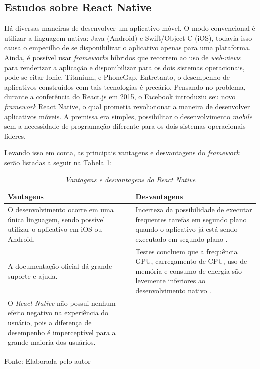 \subsection{Estudos sobre React Native} 
Há diversas maneiras de desenvolver um aplicativo móvel. O modo convencional é utilizar a linguagem nativa: Java (Android) e Swift/Object-C (iOS), todavia isso causa o empecilho de se disponibilizar o aplicativo apenas para uma plataforma. Ainda, é possível usar \textit{frameworks} híbridos que recorrem ao uso de \textit{web-views} para renderizar a aplicação e disponibilizar para os dois sistemas operacionais, pode-se citar Ionic, Titanium, e PhoneGap. Entretanto, o desempenho de aplicativos construídos com tais tecnologias é precário. Pensando no problema, durante a conferência do React.js em 2015, o Facebook introduziu seu novo \textit{framework} React Native, o qual prometia revolucionar a maneira de desenvolver aplicativos móveis. A premissa era simples, possibilitar o desenvolvimento \textit{mobile} sem a necessidade de programação diferente para os dois sistemas operacionais líderes.

Levando isso em conta, as principais vantagens e desvantagens do \textit{framework} serão listadas a seguir na Tabela \ref{tab:vanDesvRN}:

\begin{table}[!ht]
\centering
\caption{\textit{Vantagens e desvantagens do React Native}}
\centering
\footnotesize
\begin{tabular}{p{7cm} p{7cm}}
\toprule
\textbf{Vantagens} \citep{danielsson2016} & \textbf{Desvantagens}                          
\\ \midrule
O desenvolvimento ocorre em uma única linguagem, sendo possível utilizar o aplicativo em iOS ou Android.
& 
Incerteza da possibilidade de executar frequentes tarefas em segundo plano quando o aplicativo já está sendo executado em segundo plano \citep{sodebergJohansson}.
\\ \midrule

A documentação oficial dá grande suporte e ajuda.
& 
Testes concluem que a frequência GPU, carregamento de CPU, uso de memória e consumo de energia são levemente inferiores ao desenvolvimento nativo \citep{danielsson2016}.
\\ \midrule

O \textit{React Native} não possui nenhum efeito negativo na experiência do usuário, pois a diferença de desempenho é imperceptível para a grande maioria dos usuários.
& 

\\ \midrule

\end{tabular}
\label{tab:vanDesvRN}

Fonte: Elaborada pelo autor
\end{table}

